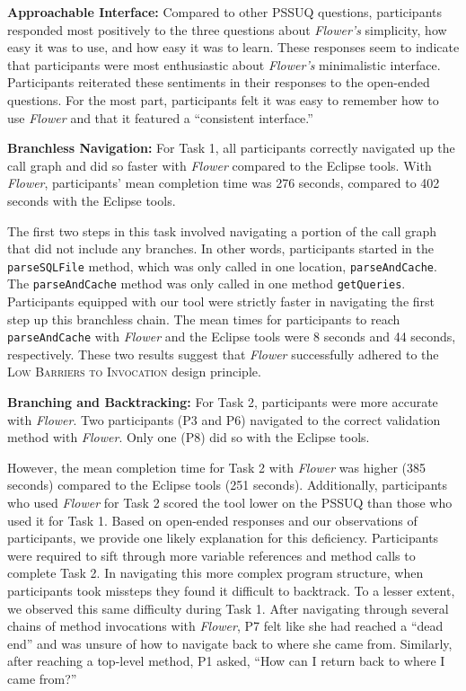 \documentclass[conference]{IEEEtran}
\begin{document}
\textbf{Approachable Interface:}
Compared to other PSSUQ questions, participants responded most positively to the three questions about \textit{Flower's} simplicity, how easy it was to use, and how easy it was to learn. 
These responses seem to indicate that participants were most enthusiastic about \textit{Flower's} minimalistic interface. 
Participants reiterated these sentiments in their responses to the open-ended questions. 
For the most part, participants felt it was easy to remember how to use \textit{Flower} and that it featured a ``consistent interface.''

\textbf{Branchless Navigation:}
For Task 1, all participants correctly navigated up the call graph and did so faster with \textit{Flower} compared to the Eclipse tools.
With \textit{Flower}, participants' mean completion time was 276 seconds, compared to 402 seconds with the Eclipse tools.

The first two steps in this task involved navigating a portion of the call graph that did not include any branches.
In other words, participants started in the \texttt{parseSQLFile} method, which was only called in one location, \texttt{parseAndCache}. 
The \texttt{parseAndCache} method was only called in one method \texttt{getQueries}.
Participants equipped with our tool were strictly faster in navigating the first step up this branchless chain. 
The mean times for participants to reach \texttt{parseAndCache} with \textit{Flower} and the Eclipse tools were 8 seconds and 44 seconds, respectively.
These two results suggest that \textit{Flower} successfully adhered to the \textsc{Low Barriers to Invocation} design principle. 

\textbf{Branching and Backtracking:}
For Task 2, participants were more accurate with \textit{Flower}.
Two participants (P3 and P6) navigated to the correct validation method with \textit{Flower}.
Only one (P8) did so with the Eclipse tools.

However, the mean completion time for Task 2 with \textit{Flower} was higher (385 seconds) compared to the Eclipse tools (251 seconds).
Additionally, participants who used \textit{Flower} for Task 2 scored the tool lower on the PSSUQ than those who used it for Task 1.
Based on open-ended responses and our observations of participants, we provide one likely explanation for this deficiency.
Participants were required to sift through more variable references and method calls to complete Task 2.
In navigating this more complex program structure, when participants took missteps they found it difficult to backtrack.
To a lesser extent, we observed this same difficulty during Task 1.
After navigating through several chains of method invocations with \textit{Flower}, P7 felt like she had reached a ``dead end'' and was unsure of how to navigate back to where she came from.
Similarly, after reaching a top-level method, P1 asked, ``How can I return back to where I came from?''
\end{document}
